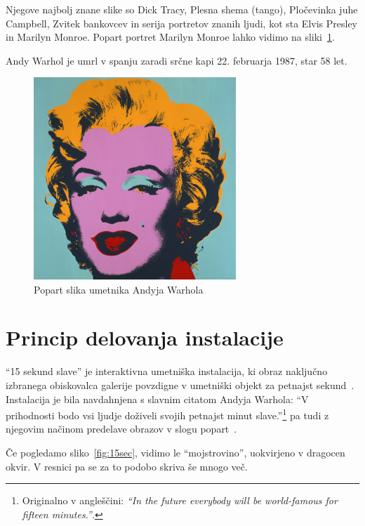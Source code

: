 \documentclass[a4paper, 12pt]{book}
\begin{document}
Njegove najbolj znane slike so Dick Tracy, Plesna shema (tango),
Plo\-če\-vin\-ka juhe Campbell, Zvitek bankovcev in serija portretov znanih
ljudi, kot sta Elvis Presley in Marilyn Monroe. Popart
portret Marilyn Monroe lahko vidimo na sliki~\ref{fig:art-marilyn}.

Andy Warhol je umrl v spanju zaradi srčne kapi 22. februarja 1987, star 58 let.

\begin{figure}[!ht]
    \centering
    \includegraphics[width=0.68\textwidth]{art-marilyn}
    \caption{Popart slika umetnika Andyja Warhola~\cite{andyExhibitionMonroe}}
    \label{fig:art-marilyn}
\end{figure}

\section{Princip delovanja instalacije}
``15 sekund slave'' je interaktivna umetniška instalacija, ki obraz naključno
izbranega obiskovalca galerije povzdigne v umetniški objekt za petnajst
sekund~\cite{leonardo}. Instalacija je bila navdahnjena s slavnim citatom
Andyja Warhola: ``V prihodnosti bodo vsi ljudje doživeli svojih petnajst minut
slave.''\footnote{Originalno v angleščini: \textit{``In the future everybody
will be world-famous for fifteen minutes.''}\cite{andyExhibition,AW}.} pa tudi z
njegovim načinom predelave obrazov v slogu popart~\cite{solina200215}.



Če pogledamo sliko~\ref{fig:15sec}, vidimo le ``mojstrovino'', uokvirjeno v
dragocen okvir. V resnici pa se za to podobo skriva še mnogo več.
\end{document}
